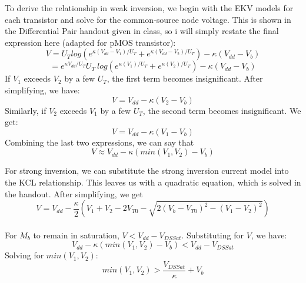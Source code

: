 \documentclass{article}
\begin{document}
To derive the relationship in weak inversion, we begin with the EKV models for each transistor and solve for the common-source node voltage. This is shown in the Differential Pair handout given in class, so i will simply restate the final expression here (adapted for pMOS transistor): \[V=U_Tlog(e^{\kappa (V_{dd}-V_1)/U_T}+e^{\kappa (V_{dd}-V_2)/U_T})-\kappa (V_{dd}-V_b)\]\[=e^{\kappa V_{dd}/U_T}U_T~log(e^{\kappa (V_1)/U_T}+e^{\kappa (V_2)/U_T})-\kappa (V_{dd}-V_b)\] 
If $V_1$ exceeds $V_2$ by a few $U_T$, the first term becomes insignificant. After simplifying, we have: \[V=V_{dd}-\kappa(V_2-V_b)\]
Similarly, if $V_2$ exceeds $V_1$ by a few $U_T$, the second term becomes insignificant. We get: \[V=V_{dd}-\kappa(V_1-V_b)\]
Combining the last two expressions, we can say that \[V \approx V_{dd}- \kappa(min(V_1,V_2)-V_b)\]

For strong inversion, we can substitute the strong inversion current model into the KCL relationship. This leaves us with a quadratic equation, which is solved in the handout. After simplifying, we get \[V=V_{dd}-\frac{\kappa}{2}(V_1+V_2-2V_{T0}-\sqrt{2(V_b-V_{T0})^2-(V_1-V_2)^2})\]\\
For $M_b$ to remain in saturation, $V<V_{dd}-V_{DSSat}$. Substituting for $V$, we have: \[V_{dd}-\kappa(min(V_1,V_2)-V_b)<V_{dd}-V_{DSSat}\]
Solving for $min(V_1,V_2)$: \[min(V_1,V_2)>\frac{V_{DSSat}}{\kappa}+V_b\]
\end{document}
